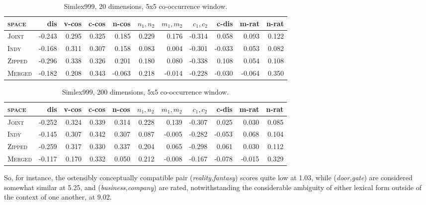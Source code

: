 \begin{table}
\begin{tabular}{lrrrrrrrrrr}
\hline
\textsc{space} & dis & v-cos & c-cos & n-cos & $n_1,n_2$ & $m_1,m_2$ & $c_1,c_2$ & c-dis & m-rat & n-rat \\
\hline
\textsc{Joint} & -0.243 & 0.295 & 0.325 & 0.185 & 0.229 & 0.176 & -0.314 & 0.058 & 0.093 & 0.122 \\
\textsc{Indy} & -0.168 & 0.311 & 0.307 & 0.158 & 0.083 & 0.004 & -0.301 & -0.033 & 0.053 & 0.082 \\
\textsc{Zipped} & -0.296 & 0.338 & 0.326 & 0.201 & 0.180 & 0.080 & -0.338 & 0.108 & 0.054 & 0.108 \\
\textsc{Merged} & -0.182 & 0.208 & 0.343 & -0.063 & 0.218 & -0.014 & -0.228 & -0.030 & -0.064 & 0.350 \\
\hline
\end{tabular}
\caption{Simlex999, 20 dimensions, 5x5 co-occurrence window.}
\end{table}

\begin{table}
\begin{tabular}{lrrrrrrrrrr}
\hline
\textsc{space} & dis & v-cos & c-cos & n-cos & $n_1,n_2$ & $m_1,m_2$ & $c_1,c_2$ & c-dis & m-rat & n-rat \\
\hline
\textsc{Joint} & -0.252 & 0.324 & 0.339 & 0.314 & 0.228 & 0.139 & -0.307 & 0.025 & 0.030 & 0.085 \\
\textsc{Indy} & -0.145 & 0.307 & 0.342 & 0.307 & 0.087 & -0.005 & -0.282 & -0.053 & 0.068 & 0.104 \\
\textsc{Zipped} & -0.259 & 0.317 & 0.330 & 0.337 & 0.204 & 0.065 & -0.298 & 0.061 & 0.030 & 0.112 \\
\textsc{Merged} & -0.117 & 0.170 & 0.332 & 0.050 & 0.212 & -0.008 & -0.167 & -0.078 & -0.015 & 0.329 \\
\hline
\end{tabular}
\caption{Simlex999, 200 dimensions, 5x5 co-occurrence window.}
\end{table}

So, for instance, the ostensibly conceptually compatible pair (\emph{reality,fantasy}) scores quite low at 1.03, while (\emph{door,gate}) are considered somewhat similar at 5.25, and (\emph{business,company}) are rated, notwithstanding the considerable ambiguity of either lexical form outside of the context of one another, at 9.02.

